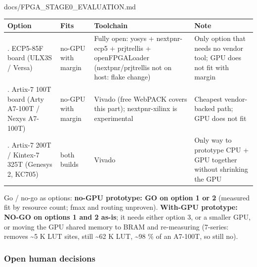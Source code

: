\begin{relocated}{docs/FPGA_STAGE0_EVALUATION.md}
{{
\begin{longtable}[]{@{}
  >{\raggedright\arraybackslash}p{}
  >{\raggedright\arraybackslash}p{}
  >{\raggedright\arraybackslash}p{}
  >{\raggedright\arraybackslash}p{}@{}}
\toprule\noalign{}
\begin{minipage}[b]{\linewidth}\raggedright
Option
\end{minipage} & \begin{minipage}[b]{\linewidth}\raggedright
Fits
\end{minipage} & \begin{minipage}[b]{\linewidth}\raggedright
Toolchain
\end{minipage} & \begin{minipage}[b]{\linewidth}\raggedright
Note
\end{minipage} \\
\midrule\noalign{}
\endhead
\bottomrule\noalign{}
\endlastfoot
1. ECP5-85F board (ULX3S / Versa) & no-GPU with margin & Fully open:
yosys + nextpnr-ecp5 + prjtrellis + openFPGALoader
(nextpnr/\allowbreak{}prjtrellis not on host: flake change) & Only
option that needs no vendor tool; GPU does not fit with margin \\
2. Artix-7 100T board (Arty A7-100T / Nexys A7-100T) & no-GPU with
margin & Vivado (free WebPACK covers this part); nextpnr-xilinx is
experimental & Cheapest vendor-backed path; GPU does not fit \\
3. Artix-7 200T / Kintex-7 325T (Genesys 2, KC705) & both builds &
Vivado & Only way to prototype CPU + GPU together without shrinking the
GPU \\
\end{longtable}
}

}

Go / no-go as options: \textbf{no-GPU prototype: GO on option 1 or 2}
(measured fit by resource count; fmax and routing unproven).
\textbf{With-GPU prototype: NO-GO on options 1 and 2 as-is}; it needs
either option 3, or a smaller GPU, or moving the GPU shared memory to
BRAM and re-measuring (7-series: removes \textasciitilde5 K LUT sites,
still \textasciitilde62 K LUT, \textasciitilde98 \% of an A7-100T, so
still no).

\subsubsection{Open human decisions}\label{tm:dec:fpga-stage0-evaluation:open-human-decisions}


\end{relocated}

